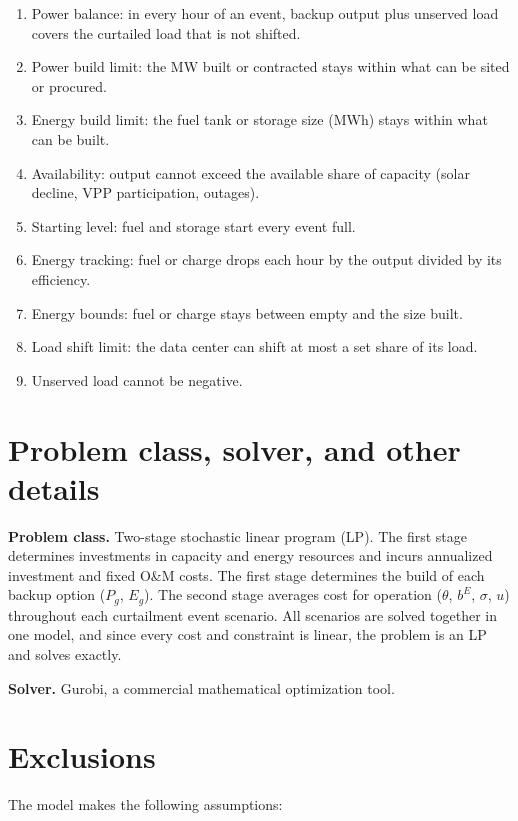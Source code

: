 \documentclass{article}
\begin{document}
\begin{enumerate}
    \item Power balance: in every hour of an event, backup output plus unserved load covers the curtailed load that is not shifted.
    \item Power build limit: the MW built or contracted stays within what can be sited or procured.
    \item Energy build limit: the fuel tank or storage size (MWh) stays within what can be built.
    \item Availability: output cannot exceed the available share of capacity (solar decline, VPP participation, outages).
    \item Starting level: fuel and storage start every event full.
    \item Energy tracking: fuel or charge drops each hour by the output divided by its efficiency.
    \item Energy bounds: fuel or charge stays between empty and the size built.
    \item Load shift limit: the data center can shift at most a set share of its load.
    \item Unserved load cannot be negative.
\end{enumerate}

\section{Problem class, solver, and other details}

\textbf{Problem class.} Two-stage stochastic linear program (LP). The first stage determines investments in capacity and energy resources and incurs annualized investment and fixed O\&M costs. The first stage determines the build of each backup option ($P_g$, $E_g$). The second stage averages cost for operation ($\theta$, $b^{E}$, $\sigma$, $u$) throughout each curtailment event scenario. All scenarios are solved together in one model, and since every cost and constraint is linear, the problem is an LP and solves exactly. 

\textbf{Solver.} Gurobi, a commercial mathematical optimization tool. 

\section{Exclusions}

The model makes the following assumptions:
\end{document}
